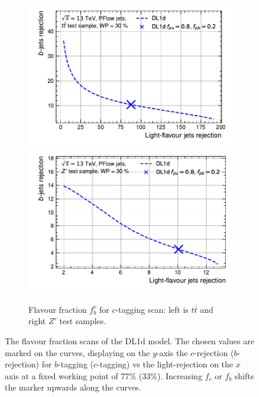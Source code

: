 \begin{figure}[h!]
\begin{subfigure}[b]{0.98\textwidth}
    \includegraphics[scale=0.65]{Images/FTAG/DL1d/extra_plots/contour_fraction_c_ttbar_299.pdf}
    \includegraphics[scale=0.65]{Images/FTAG/DL1d/extra_plots/contour_fraction_c_zp_299.pdf}
    \caption{Flavour fraction $f_b^c$ for $c$-tagging scan: left is $t\bar{t}$ and right $Z'$ test samples.} 
    \label{fig:DL1dscanfc}
\end{subfigure}
  \caption{The flavour fraction scans of the DL1d model. The chosen values are marked on the curves, displaying on the $y$-axis the $c$-rejection ($b$-rejection) for $b$-tagging ($c$-tagging) vs the light-rejection on the $x$ axis at a fixed working point of 77\% (33\%). Increasing $f_c$ or $f_b$ shifts the marker upwards along the curves. }
  \label{fig:DL1dscanf}
\end{figure} 

